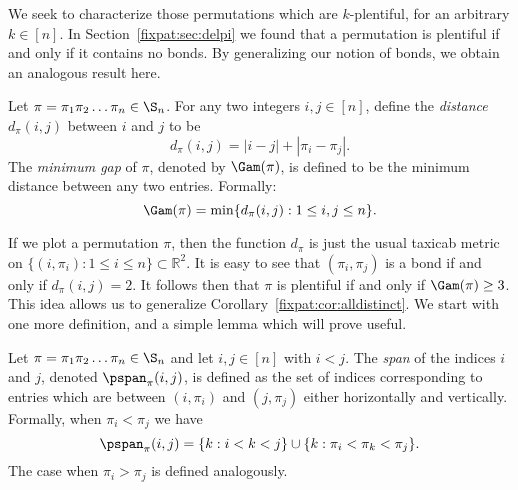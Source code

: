 \documentclass[12pt,twoside]{memoir}
\begin{document}
    We seek to characterize those permutations which are $k$-plentiful, for an
    arbitrary $k \in [n]$. In Section~\ref{fixpat:sec:delpi} we found that a
    permutation is plentiful if and only if it contains no bonds. By generalizing
    our notion of bonds, we obtain an analogous result here. 

    \begin{definition} \label{fixpat:def:gap}
      Let $\pi = \pi_1 \pi_2 \dots \pi_n \in \S_n$. For any two integers $i,j
      \in [n]$, define the \emph{distance} $d_\pi(i,j)$ between $i$ and $j$ to be 
      $$ d_\pi(i,j) = |i - j| + |\pi_i - \pi_j|.$$
      The \emph{minimum gap} of $\pi$, denoted by $\Gam(\pi)$, is defined to be
      the minimum distance between any two entries. Formally:
      $$ \Gam(\pi) = \min\{ d_\pi(i,j) : 1 \leq i, j \leq n \}.$$
    \end{definition}

    If we plot a permutation $\pi$, then the function $d_\pi$ is just the usual
    taxicab metric on $\{(i, \pi_i) : 1 \leq i \leq n\} \subset \mathbb{R}^2$. 
    It is easy to see that $(\pi_i, \pi_j)$ is a bond if and only if $d_\pi(i,j)
    = 2$. It follows then that $\pi$ is plentiful if and only if $\Gam(\pi) \geq 3$.
    This idea allows us to generalize Corollary~\ref{fixpat:cor:alldistinct}.  We
    start with one more definition, and a simple lemma which will prove useful. 

    \begin{definition} \label{fixpat:def:span}
      Let $\pi = \pi_1 \pi_2 \dots \pi_n \in \S_n$ and let $i,j \in [n]$ with $i
      < j$. The \emph{span} of the indices $i$ and $j$, denoted
      $\pspan_\pi(i,j)$, is defined as the set of indices corresponding to
      entries which are between $(i,\pi_i)$ and $(j,\pi_j)$ either horizontally
      and vertically. Formally, when $\pi_i < \pi_j$ we have
      $$ 
      \pspan_\pi(i,j) = \{k : i < k < j\} \cup \{k : \pi_i < \pi_k < \pi_j \}.
      $$
      The case when $\pi_i > \pi_j$ is defined analogously. 
    \end{definition}
    
\end{document}

